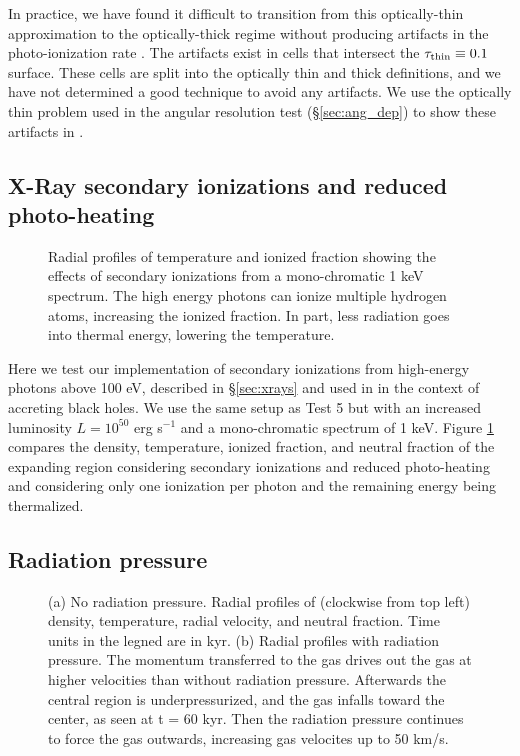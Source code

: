 \documentclass[12pt,preprint]{aastex}
\begin{document}
In practice, we have found it difficult to transition from this
optically-thin approximation to the optically-thick regime without
producing artifacts in the photo-ionization rate \kph.  The artifacts
exist in cells that intersect the $\tau_{\rm thin} \equiv 0.1$
surface.  These cells are split into the optically thin and thick
definitions, and we have not determined a good technique to avoid any
artifacts.  We use the optically thin problem used in the angular
resolution test (\S\ref{sec:ang_dep}) to show these artifacts in \kph.

\subsection{X-Ray secondary ionizations and reduced photo-heating}

\begin{figure}[t]
  \caption{\label{fig:xray_fig} Radial profiles of temperature and
    ionized fraction showing the effects of secondary ionizations from
    a mono-chromatic 1 keV spectrum.  The high energy photons can
    ionize multiple hydrogen atoms, increasing the ionized fraction.
    In part, less radiation goes into thermal energy, lowering the
    temperature.}
\end{figure}

Here we test our implementation of secondary ionizations from
high-energy photons above 100 eV, described in \S\ref{sec:xrays} and
used in \citet{Alvarez09} in the context of accreting black holes.  We
use the same setup as Test 5 but with an increased luminosity $L =
10^{50}$ erg s$^{-1}$ and a mono-chromatic spectrum of 1 keV.  Figure
\ref{fig:xray_fig} compares the density, temperature, ionized
fraction, and neutral fraction of the expanding  region
considering secondary ionizations and reduced photo-heating and
considering only one ionization per photon and the remaining energy
being thermalized.

\subsection{Radiation pressure}

\begin{figure}[t]
  \caption{\label{fig:rp_profile150} (a) No radiation pressure.
    Radial profiles of (clockwise from top left) density, temperature,
    radial velocity, and neutral fraction.  Time units in the legned
    are in kyr.  (b) Radial profiles with radiation pressure.  The
    momentum transferred to the gas drives out the gas at higher
    velocities than without radiation pressure.  Afterwards the
    central region is underpressurized, and the gas infalls toward the
    center, as seen at t = 60 kyr.  Then the radiation pressure
    continues to force the gas outwards, increasing gas velocites up
    to 50 km/s.}
\end{figure}
\end{document}
